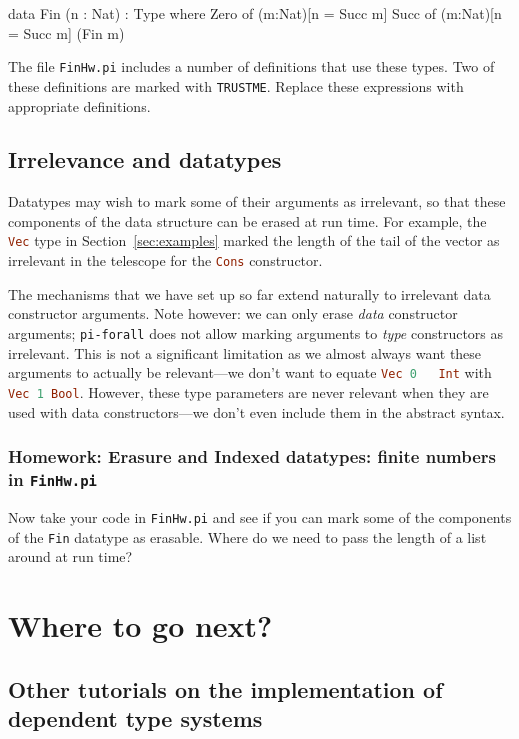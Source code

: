 \documentclass{article}
\newcommand\cd[1]{\lstinline[language=Haskell]{#1}}
\newcommand\pif{\texttt{pi-forall}\xspace}
\theoremstyle{definition}
\begin{document}
\begin{piforall}
data Fin (n : Nat) : Type where
   Zero of (m:Nat)[n = Succ m]
   Succ of (m:Nat)[n = Succ m] (Fin m)
\end{piforall}

The file \texttt{FinHw.pi} includes a number of definitions
that use these types. Two of these definitions are marked with
\texttt{TRUSTME}. Replace these expressions with appropriate definitions.

\subsection{Irrelevance and datatypes}

Datatypes may wish to mark some of their arguments as irrelevant, so that
these components of the data structure can be erased at run time. For example,
the \cd{Vec} type in Section~\ref{sec:examples} marked the length of the tail
of the vector as irrelevant in the telescope for the \cd{Cons} constructor.

The mechanisms that we have set up so far extend naturally to irrelevant data
constructor arguments. Note however: we can only erase \emph{data} constructor
arguments; \pif does not allow marking arguments to \emph{type} constructors
as irrelevant. This is not a significant limitation as we almost always want
these arguments to actually be relevant---we don't want to equate \cd{Vec 0
  Int} with \cd{Vec 1 Bool}. However, these type parameters are never relevant
when they are used with data constructors---we don't even include them in the
abstract syntax.

\subsubsection{Homework: Erasure and Indexed datatypes: finite numbers in \texttt{FinHw.pi} }

Now take your code in \texttt{FinHw.pi} and see if you can mark some of the
components of the \texttt{Fin} datatype as erasable. Where do we need to pass
the length of a list around at run time?

\section{Where to go next?}
\label{sec:related-work}

\subsection{Other tutorials on the implementation of dependent type systems}
\end{document}
